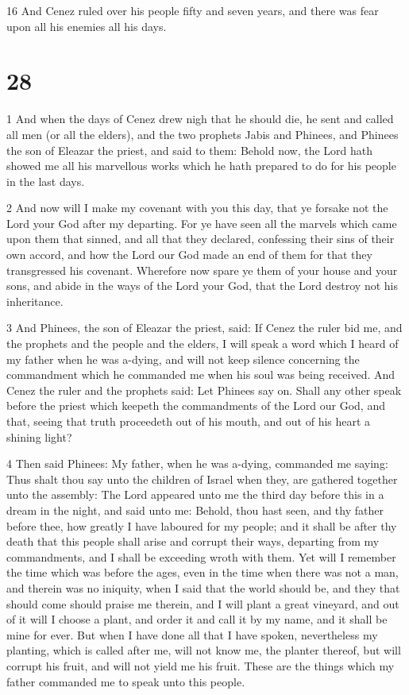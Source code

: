 \par 16 And Cenez ruled over his people fifty and seven years, and there was fear upon all his enemies all his days.

\chapter{28}

\par 1 And when the days of Cenez drew nigh that he should die, he sent and called all men (or all the elders), and the two prophets Jabis and Phinees, and Phinees the son of Eleazar the priest, and said to them: Behold now, the Lord hath showed me all his marvellous works which he hath prepared to do for his people in the last days.

\par 2 And now will I make my covenant with you this day, that ye forsake not the Lord your God after my departing. For ye have seen all the marvels which came upon them that sinned, and all that they declared, confessing their sins of their own accord, and how the Lord our God made an end of them for that they transgressed his covenant. Wherefore now spare ye them of your house and your sons, and abide in the ways of the Lord your God, that the Lord destroy not his inheritance.

\par 3 And Phinees, the son of Eleazar the priest, said: If Cenez the ruler bid me, and the prophets and the people and the elders, I will speak a word which I heard of my father when he was a-dying, and will not keep silence concerning the commandment which he commanded me when his soul was being received. And Cenez the ruler and the prophets said: Let Phinees say on. Shall any other speak before the priest which keepeth the commandments of the Lord our God, and that, seeing that truth proceedeth out of his mouth, and out of his heart a shining light?

\par 4 Then said Phinees: My father, when he was a-dying, commanded me saying: Thus shalt thou say unto the children of Israel when they, are gathered together unto the assembly: The Lord appeared unto me the third day before this in a dream in the night, and said unto me: Behold, thou hast seen, and thy father before thee, how greatly I have laboured for my people; and it shall be after thy death that this people shall arise and corrupt their ways, departing from my commandments, and I shall be exceeding wroth with them. Yet will I remember the time which was before the ages, even in the time when there was not a man, and therein was no iniquity, when I said that the world should be, and they that should come should praise me therein, and I will plant a great vineyard, and out of it will I choose a plant, and order it and call it by my name, and it shall be mine for ever. But when I have done all that I have spoken, nevertheless my planting, which is called after me, will not know me, the planter thereof, but will corrupt his fruit, and will not yield me his fruit. These are the things which my father commanded me to speak unto this people.

